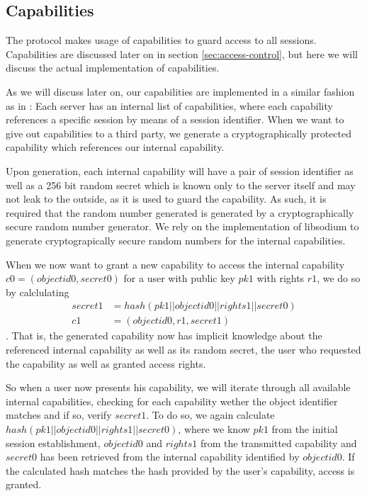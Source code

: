 \subsection{Capabilities}
\label{sec:capabilities}

The protocol makes usage of capabilities to guard access to all sessions.
Capabilities are discussed later on in section \ref{sec:access-control}, but here we will discuss the actual implementation of capabilities.

As we will discuss later on, our capabilities are implemented in a similar fashion as in \cite{gong1989secure}:
Each server has an internal list of capabilities, where each capability references a specific session by means of a session identifier.
When we want to give out capabilities to a third party, we generate a cryptographically protected capability which references our internal capability.

Upon generation, each internal capability will have a pair of session identifier as well as a 256 bit random secret which is known only to the server itself and may not leak to the outside, as it is used to guard the capability.
As such, it is required that the random number generated is generated by a cryptographically secure random number generator.
We rely on the implementation of libsodium to generate cryptograpically secure random numbers for the internal capabilities.

When we now want to grant a new capability to access the internal capability $c0 = (objectid0, secret0)$ for a user with public key $pk1$ with rights $r1$, we do so by calclulating
\begin{align*}
    secret1 &= hash(pk1 || objectid0 || rights1 || secret0) \\
    c1 &= (objectid0, r1, secret1)
\end{align*}.
That is, the generated capability now has implicit knowledge about the referenced internal capability as well as its random secret, the user who requested the capability as well as granted access rights.

So when a user now presents his capability, we will iterate through all available internal capabilities, checking for each capability wether the object identifier matches and if so, verify $secret1$.
To do so, we again calculate $hash(pk1 || objectid0 || rights1 || secret0)$, where we know $pk1$ from the initial session establishment, $objectid0$ and $rights1$ from the transmitted capability and $secret0$ has been retrieved from the internal capability identified by $objectid0$.
If the calculated hash matches the hash provided by the user's capability, access is granted.

